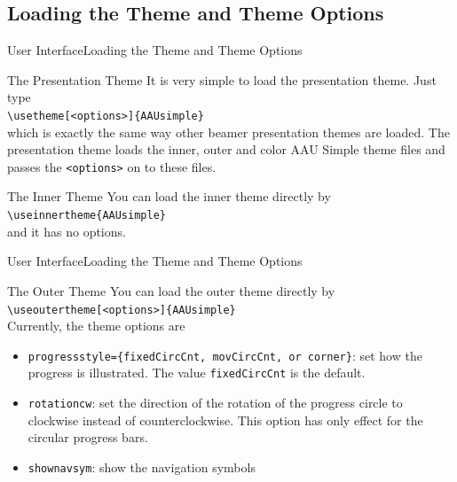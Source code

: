 \documentclass[10pt]{beamer}
\begin{document}
\subsection{Loading the Theme and Theme Options}
\begin{frame}{User Interface}{Loading the Theme and Theme Options}
  \begin{block}{The Presentation Theme}
    It is very simple to load the presentation theme. Just type\\
    {\tt \textbackslash usetheme[<options>]\{AAUsimple\}}\\
    which is exactly the same way other beamer presentation themes are loaded. The presentation theme loads the inner, outer and color AAU Simple theme files and passes the {\tt <options>} on to these files.
  \end{block}
  \begin{block}{The Inner Theme}
    You can load the inner theme directly by\\
    {\tt \textbackslash useinnertheme\{AAUsimple\}}\\
    and it has no options.
  \end{block}
\end{frame}

\begin{frame}{User Interface}{Loading the Theme and Theme Options}
  \begin{block}{The Outer Theme}
    You can load the outer theme directly by\\
    {\tt \textbackslash useoutertheme[<options>]\{AAUsimple\}}\\
    Currently, the theme options are
  \begin{itemize}
    \item {\tt progressstyle=\{fixedCircCnt, movCircCnt, or corner\}}: set how the progress is illustrated. The value {\tt fixedCircCnt} is the default. 
    \item {\tt rotationcw}: set the direction of the rotation of the progress circle to clockwise instead of counterclockwise. This option has only effect for the circular progress bars.
    \item {\tt shownavsym}: show the navigation symbols
  \end{itemize}
  \end{block}
\end{frame}
\end{document}

